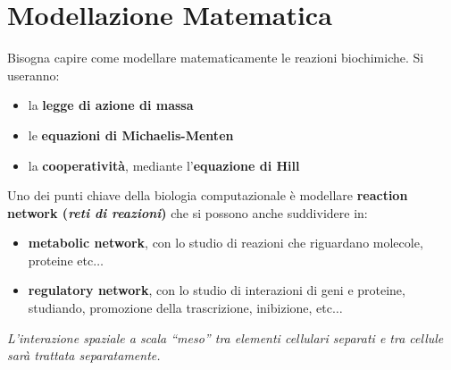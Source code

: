 \documentclass[a4paper,12pt, oneside]{book}
\begin{document}
\section{Modellazione Matematica}
Bisogna capire come modellare matematicamente le reazioni biochimiche. Si
useranno:
\begin{itemize}
  \item la \textbf{legge di azione di massa}
  \item le \textbf{equazioni di Michaelis-Menten}
  \item la \textbf{cooperatività}, mediante l'\textbf{equazione di Hill}
\end{itemize}
Uno dei punti chiave della biologia computazionale è modellare \textbf{reaction
  network (\textit{reti di reazioni})} che si possono anche suddividere in:
\begin{itemize}
  \item \textbf{metabolic network}, con lo studio di reazioni che riguardano
  molecole, proteine etc$\ldots$
  \item \textbf{regulatory network}, con lo studio di interazioni di geni e
  proteine, studiando, promozione della trascrizione, inibizione, etc$\ldots$
\end{itemize}
\textit{L'interazione spaziale a scala ``meso'' tra elementi cellulari separati
  e tra cellule sarà trattata separatamente.}
\end{document}
